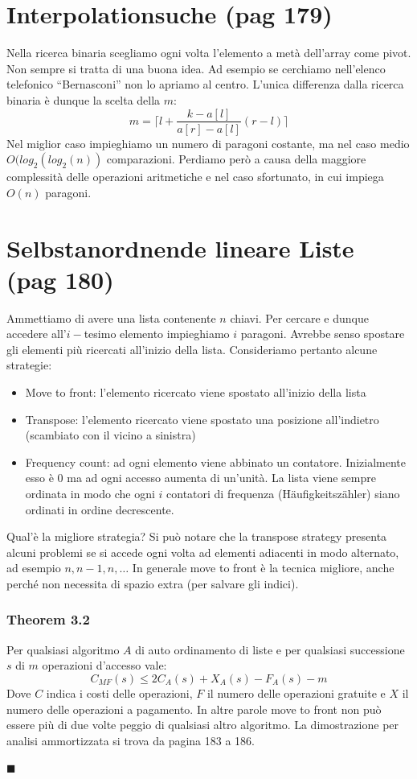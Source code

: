 \documentclass[a4paper]{book}
\newenvironment{mytheorem}[1]{\subsubsection*{Theorem #1}}{\begin{flushright}$\blacksquare$\end{flushright}}
\begin{document}
\section{Interpolationsuche (pag 179)}
Nella ricerca binaria scegliamo ogni volta l'elemento a metà dell'array come pivot. Non sempre si tratta di una buona idea. Ad esempio se cerchiamo nell'elenco telefonico ``Bernasconi'' non lo apriamo al centro. L'unica differenza dalla ricerca binaria è dunque la scelta della $m$:
$$m= \lceil l+ \frac{k-a[l]}{a[r]-a[l]}(r-l) \rceil$$
Nel miglior caso impieghiamo un numero di paragoni costante, ma nel caso medio $O(log_2(log_2(n))$ comparazioni. Perdiamo però a causa della maggiore complessità delle operazioni aritmetiche e nel caso sfortunato, in cui impiega $O(n)$ paragoni.
\section{Selbstanordnende lineare Liste (pag 180)}
Ammettiamo di avere una lista contenente $n$ chiavi. Per cercare e dunque accedere all'$i-$tesimo elemento impieghiamo $i$ paragoni. Avrebbe senso spostare gli elementi più ricercati all'inizio della lista. Consideriamo pertanto alcune strategie: 
\begin{itemize}
\item Move to front: l'elemento ricercato viene spostato all'inizio della lista
\item Transpose: l'elemento ricercato viene spostato una posizione all'indietro (scambiato con il vicino a sinistra)
\item Frequency count: ad ogni elemento viene abbinato un contatore. Inizialmente esso è 0 ma ad ogni accesso aumenta di un'unità. La lista viene sempre ordinata in modo che ogni $i$ contatori di frequenza (Häufigkeitszähler) siano ordinati in ordine decrescente. 
\end{itemize}
Qual'è la migliore strategia? Si può notare che la transpose strategy presenta alcuni problemi se si accede ogni volta ad elementi adiacenti in modo alternato, ad esempio $n,n-1,n,\dots$ In generale move to front è la tecnica migliore, anche perché non necessita di spazio extra (per salvare gli indici).
\begin{mytheorem}{3.2}
Per qualsiasi algoritmo $A$ di auto ordinamento di liste e per qualsiasi successione $s$ di $m$ operazioni d'accesso vale:
$$ C_{MF}(s) \leq 2C_A(s)+X_A(s)-F_A(s)-m $$
Dove $C$ indica i costi delle operazioni, $F$ il numero delle operazioni gratuite e $X$ il numero delle operazioni a pagamento. In altre parole move to front non può essere più di due volte peggio di qualsiasi altro algoritmo. La dimostrazione per analisi ammortizzata si trova da pagina 183 a 186.
\end{mytheorem}
\end{document}
